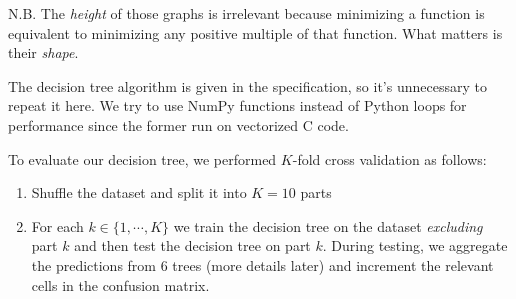 \documentclass[12pt, a4paper]{article}
\begin{document}
N.B. The \textit{height} of those graphs is irrelevant because minimizing a function is equivalent to minimizing any positive multiple of that function. What matters is their \textit{shape}.\par
\bigskip
The decision tree algorithm is given in the specification, so it's unnecessary to repeat it here. We try to use NumPy functions instead of Python loops for performance since the former run on vectorized C code.\par
\bigskip
To evaluate our decision tree, we performed $K$-fold cross validation as follows:
\begin{enumerate}
    \item Shuffle the dataset and split it into $K = 10$ parts
    \item For each $k \in \{1, \dotsm, K\}$ we train the decision tree on the dataset \textit{excluding} part $k$ and then test the decision tree on part $k$. During testing, we aggregate the predictions from 6 trees (more details later) and increment the relevant cells in the confusion matrix.
\end{enumerate}
\end{document}
